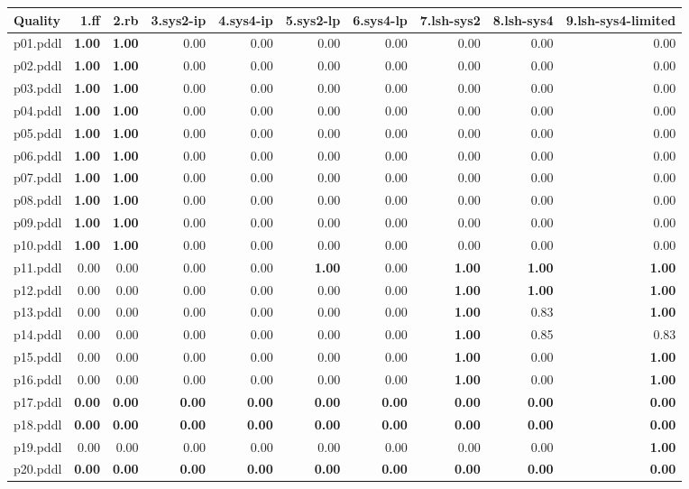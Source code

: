 \documentclass{article}
\begin{document}
\begin{tabular}{@{}lrrrrrrrrr@{}}
Quality & 1.ff & 2.rb & 3.sys2-ip & 4.sys4-ip & 5.sys2-lp & 6.sys4-lp & 7.lsh-sys2 & 8.lsh-sys4 & 9.lsh-sys4-limited \\
\midrule
p01.pddl & \textbf{1.00} & \textbf{1.00} & 0.00 & 0.00 & 0.00 & 0.00 & 0.00 & 0.00 & 0.00 \\
p02.pddl & \textbf{1.00} & \textbf{1.00} & 0.00 & 0.00 & 0.00 & 0.00 & 0.00 & 0.00 & 0.00 \\
p03.pddl & \textbf{1.00} & \textbf{1.00} & 0.00 & 0.00 & 0.00 & 0.00 & 0.00 & 0.00 & 0.00 \\
p04.pddl & \textbf{1.00} & \textbf{1.00} & 0.00 & 0.00 & 0.00 & 0.00 & 0.00 & 0.00 & 0.00 \\
p05.pddl & \textbf{1.00} & \textbf{1.00} & 0.00 & 0.00 & 0.00 & 0.00 & 0.00 & 0.00 & 0.00 \\
p06.pddl & \textbf{1.00} & \textbf{1.00} & 0.00 & 0.00 & 0.00 & 0.00 & 0.00 & 0.00 & 0.00 \\
p07.pddl & \textbf{1.00} & \textbf{1.00} & 0.00 & 0.00 & 0.00 & 0.00 & 0.00 & 0.00 & 0.00 \\
p08.pddl & \textbf{1.00} & \textbf{1.00} & 0.00 & 0.00 & 0.00 & 0.00 & 0.00 & 0.00 & 0.00 \\
p09.pddl & \textbf{1.00} & \textbf{1.00} & 0.00 & 0.00 & 0.00 & 0.00 & 0.00 & 0.00 & 0.00 \\
p10.pddl & \textbf{1.00} & \textbf{1.00} & 0.00 & 0.00 & 0.00 & 0.00 & 0.00 & 0.00 & 0.00 \\
p11.pddl & 0.00 & 0.00 & 0.00 & 0.00 & \textbf{1.00} & 0.00 & \textbf{1.00} & \textbf{1.00} & \textbf{1.00} \\
p12.pddl & 0.00 & 0.00 & 0.00 & 0.00 & 0.00 & 0.00 & \textbf{1.00} & \textbf{1.00} & \textbf{1.00} \\
p13.pddl & 0.00 & 0.00 & 0.00 & 0.00 & 0.00 & 0.00 & \textbf{1.00} & 0.83 & \textbf{1.00} \\
p14.pddl & 0.00 & 0.00 & 0.00 & 0.00 & 0.00 & 0.00 & \textbf{1.00} & 0.85 & 0.83 \\
p15.pddl & 0.00 & 0.00 & 0.00 & 0.00 & 0.00 & 0.00 & \textbf{1.00} & 0.00 & \textbf{1.00} \\
p16.pddl & 0.00 & 0.00 & 0.00 & 0.00 & 0.00 & 0.00 & \textbf{1.00} & 0.00 & \textbf{1.00} \\
p17.pddl & \textbf{0.00} & \textbf{0.00} & \textbf{0.00} & \textbf{0.00} & \textbf{0.00} & \textbf{0.00} & \textbf{0.00} & \textbf{0.00} & \textbf{0.00} \\
p18.pddl & \textbf{0.00} & \textbf{0.00} & \textbf{0.00} & \textbf{0.00} & \textbf{0.00} & \textbf{0.00} & \textbf{0.00} & \textbf{0.00} & \textbf{0.00} \\
p19.pddl & 0.00 & 0.00 & 0.00 & 0.00 & 0.00 & 0.00 & 0.00 & 0.00 & \textbf{1.00} \\
p20.pddl & \textbf{0.00} & \textbf{0.00} & \textbf{0.00} & \textbf{0.00} & \textbf{0.00} & \textbf{0.00} & \textbf{0.00} & \textbf{0.00} & \textbf{0.00} \\
\end{tabular}
\end{document}
